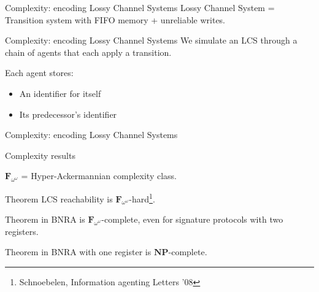 \documentclass{beamer}
\begin{document}
\appendix
 \begin{frame}
  
 \end{frame}
\begin{frame}{Complexity: encoding Lossy Channel Systems}
	Lossy Channel System = Transition system with FIFO memory + unreliable writes.\vspace{1cm}
	
	
\end{frame}


\begin{frame}{Complexity: encoding Lossy Channel Systems}
	We simulate an LCS through a chain of agents that each apply a transition.
	
	Each agent stores:
	\begin{itemize}
		\item An identifier for itself
		
		\item Its predecessor's identifier
	\end{itemize} 
	
	
	
\end{frame}

\begin{frame}{Complexity: encoding Lossy Channel Systems}
	
	
	
\end{frame}

\begin{frame}{Complexity results}
	
	$\mathbf{F}_{\omega^\omega}$ = Hyper-Ackermannian complexity class.
	
	\begin{block}{Theorem}
		LCS reachability is $\mathbf{F}_{\omega^\omega}$-hard\footnote{Schnoebelen, Information agenting Letters '08}.
	\end{block}
	\pause 

	\begin{block}{Theorem}
		{} in BNRA is $\mathbf{F}_{\omega^\omega}$-complete, even for signature protocols with two registers.
	\end{block}
	\pause 

	\begin{block}{Theorem}
		 {} in BNRA with one register is $\mathbf{NP}$-complete.
	\end{block}
	
\end{frame}
\end{document}
